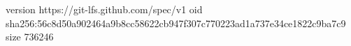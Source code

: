 version https://git-lfs.github.com/spec/v1
oid sha256:56c8d50a902464a9b8cc58622cb947f307c770223ad1a737e34ce1822c9ba7c9
size 736246
